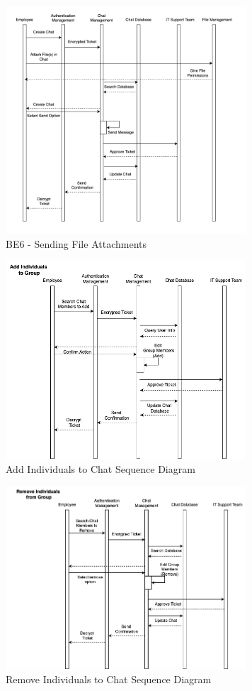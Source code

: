 \documentclass[]{article}
\begin{document}
\begin{figure}[ht]
    \centering
    \includegraphics[width=9cm]{BE6.png}
    \caption{BE6 - Sending File Attachments}
    \label{fig:galaxy}
\end{figure}

\begin{figure}[H]
	\centering
	\includegraphics[width=0.8\textwidth]{BE7.png}
	\caption{Add Individuals to Chat Sequence Diagram}
\end{figure}

\begin{figure}[H]
	\centering
	\includegraphics[width=0.8\textwidth]{BE8.png}
	\caption{Remove Individuals to Chat Sequence Diagram}
\end{figure}
\end{document}
